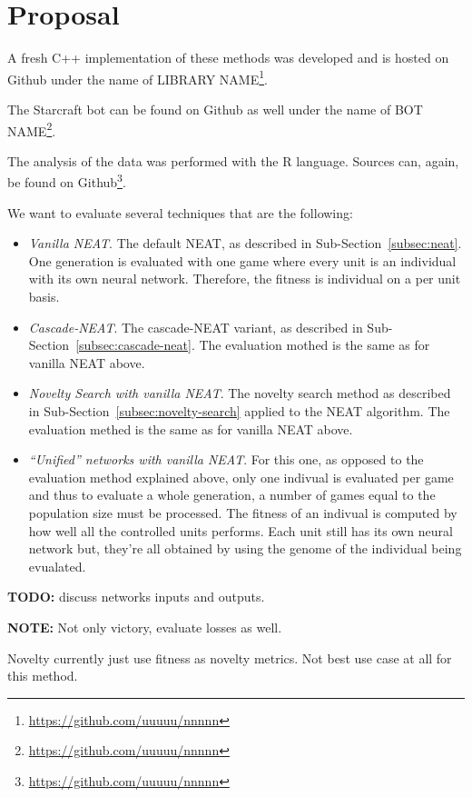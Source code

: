 \section{Proposal}\label{section:proposal}

A fresh C++ implementation of these methods was developed and is hosted on Github under the name of LIBRARY
NAME\footnote{\url{https://github.com/uuuuu/nnnnn}}.%

The Starcraft bot can be found on Github as well under the name of
BOT NAME\footnote{\url{https://github.com/uuuuu/nnnnn}}.%

The analysis of the data was performed with the R language. Sources can, again,
be found on Github\footnote{\url{https://github.com/uuuuu/nnnnn}}.%

We want to evaluate several techniques that are the following:
\begin{itemize}
    \item \emph{Vanilla NEAT}. The default NEAT, as described in Sub-Section~\ref{subsec:neat}. One generation is evaluated with one game
        where every unit is an individual with its own neural network. Therefore, the fitness is individual on a per unit basis.
    \item \emph{Cascade-NEAT}. The cascade-NEAT variant, as described in Sub-Section~\ref{subsec:cascade-neat}.
        The evaluation mothed is the same as for vanilla NEAT above.
    \item \emph{Novelty Search with vanilla NEAT}. The novelty search method as described in Sub-Section~\ref{subsec:novelty-search} applied to the NEAT algorithm.
        The evaluation methed is the same as for vanilla NEAT above.
    \item \emph{``Unified'' networks with vanilla NEAT}. For this one, as opposed to the evaluation method explained above, only one indivual is
        evaluated per game and thus to evaluate a whole generation, a number of games equal to the population size must be processed.
        The fitness of an indivual is computed by how well all the controlled units performs. Each unit still has its own neural network
        but, they're all obtained by using the genome of the individual being evualated.
\end{itemize}

{\bf TODO:} discuss networks inputs and outputs.

{\bf NOTE:}
Not only victory, evaluate losses as well.


Novelty currently just use fitness as novelty metrics. Not best use case at
all for this method.

